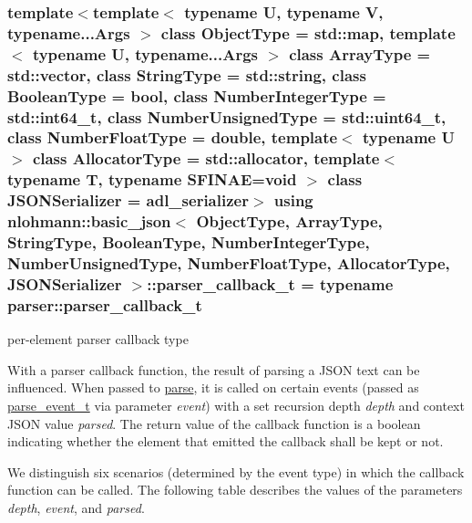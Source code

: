 \subsubsection[{\texorpdfstring{parser\+\_\+callback\+\_\+t}{parser_callback_t}}]{\setlength{\rightskip}{0pt plus 5cm}template$<$template$<$ typename U, typename V, typename...\+Args $>$ class Object\+Type = std\+::map, template$<$ typename U, typename...\+Args $>$ class Array\+Type = std\+::vector, class String\+Type  = std\+::string, class Boolean\+Type  = bool, class Number\+Integer\+Type  = std\+::int64\+\_\+t, class Number\+Unsigned\+Type  = std\+::uint64\+\_\+t, class Number\+Float\+Type  = double, template$<$ typename U $>$ class Allocator\+Type = std\+::allocator, template$<$ typename T, typename S\+F\+I\+N\+A\+E=void $>$ class J\+S\+O\+N\+Serializer = adl\+\_\+serializer$>$ using {\bf nlohmann\+::basic\+\_\+json}$<$ Object\+Type, Array\+Type, String\+Type, Boolean\+Type, Number\+Integer\+Type, Number\+Unsigned\+Type, Number\+Float\+Type, Allocator\+Type, J\+S\+O\+N\+Serializer $>$\+::{\bf parser\+\_\+callback\+\_\+t} =  typename {\bf parser\+::parser\+\_\+callback\+\_\+t}}\hypertarget{classnlohmann_1_1basic__json_ab4f78c5f9fd25172eeec84482e03f5b7}{}\label{classnlohmann_1_1basic__json_ab4f78c5f9fd25172eeec84482e03f5b7}


per-\/element parser callback type 

With a parser callback function, the result of parsing a J\+S\+ON text can be influenced. When passed to \hyperlink{classnlohmann_1_1basic__json_a265a473e939184aa42655c9ccdf34e58}{parse}, it is called on certain events (passed as \hyperlink{classnlohmann_1_1basic__json_aaceba2e4cf75fc983bb75c78c8742e65}{parse\+\_\+event\+\_\+t} via parameter {\itshape event}) with a set recursion depth {\itshape depth} and context J\+S\+ON value {\itshape parsed}. The return value of the callback function is a boolean indicating whether the element that emitted the callback shall be kept or not.

We distinguish six scenarios (determined by the event type) in which the callback function can be called. The following table describes the values of the parameters {\itshape depth}, {\itshape event}, and {\itshape parsed}.

